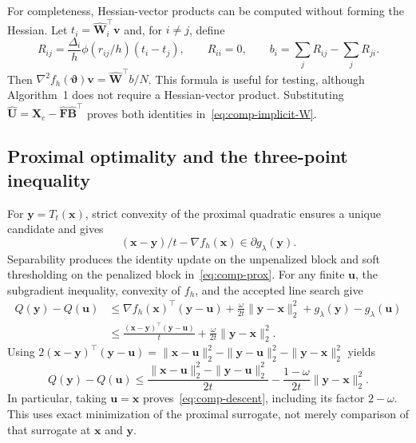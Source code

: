 For completeness, Hessian-vector products can be computed without forming the Hessian. Let $t_i=\widehat{\bm{W}}_i^\top \bm{v}$ and, for $i\ne j$, define
\[
 R_{ij}=\frac{\Delta_i}{h}\phi(r_{ij}/h)(t_i-t_j),\qquad R_{ii}=0,
 \qquad b_i=\sum_jR_{ij}-\sum_jR_{ji}.
\]
Then $\nabla^2 f_h(\bm{\vartheta})\bm{v}=\widehat{\bm{W}}^\top b/N$. This formula is useful for testing, although Algorithm~1 does not require a Hessian-vector product. Substituting $\widehat{\bm{U}}=\bm{X}_c-\widehat{\bm{F}}\widehat{\bm{B}}^\top$ proves both identities in~\eqref{eq:comp-implicit-W}.

\subsection{Proximal optimality and the three-point inequality}
\label{subapp:comp-threepoint}
For $\bm{y}=T_t(\bm{x})$, strict convexity of the proximal quadratic ensures a unique candidate and gives
\begin{equation}
 (\bm{x}-\bm{y})/t-\nabla f_h(\bm{x})\in\partial g_\lambda(\bm{y}).
 \label{eq:E-prox-subgradient}
\end{equation}
Separability produces the identity update on the unpenalized block and soft thresholding on the penalized block in~\eqref{eq:comp-prox}. For any finite $\bm{u}$, the subgradient inequality, convexity of $f_h$, and the accepted line search give
\begin{align*}
 Q(\bm{y})-Q(\bm{u})
 &\le \nabla f_h(\bm{x})^\top(\bm{y}-\bm{u})
       +\frac{\omega}{2t}\|\bm{y}-\bm{x}\|_2^2+g_\lambda(\bm{y})-g_\lambda(\bm{u})\\
 &\le \frac{(\bm{x}-\bm{y})^\top(\bm{y}-\bm{u})}t
       +\frac{\omega}{2t}\|\bm{y}-\bm{x}\|_2^2.
\end{align*}
Using $2(\bm{x}-\bm{y})^\top(\bm{y}-\bm{u})=\|\bm{x}-\bm{u}\|_2^2-\|\bm{y}-\bm{u}\|_2^2-\|\bm{y}-\bm{x}\|_2^2$ yields
\begin{equation}
 Q(\bm{y})-Q(\bm{u})\le
 \frac{\|\bm{x}-\bm{u}\|_2^2-\|\bm{y}-\bm{u}\|_2^2}{2t}
       -\frac{1-\omega}{2t}\|\bm{y}-\bm{x}\|_2^2.
 \label{eq:E-threepoint}
\end{equation}
In particular, taking $\bm{u}=\bm{x}$ proves~\eqref{eq:comp-descent}, including its factor $2-\omega$. This uses exact minimization of the proximal surrogate, not merely comparison of that surrogate at $\bm{x}$ and $\bm{y}$.

